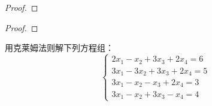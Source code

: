 \begin{example}
    
\end{example}



\begin{solution}
    
\end{solution}

\begin{example}
    
\end{example}



\begin{solution}
    
\end{solution}

\begin{proof}
    
\end{proof}

\begin{proof}
    
\end{proof}




















\begin{ex}
    用克莱姆法则解下列方程组：
\[\begin{cases}
    2x_1-x_2+3x_3+2x_4=6\\
    3x_1-3x_2+3x_3+2x_4=5\\
    3x_1-x_2-x_3+2x_4=3\\
    3x_1-x_2+3x_3-x_4=4
\end{cases}  \]
\end{ex}

